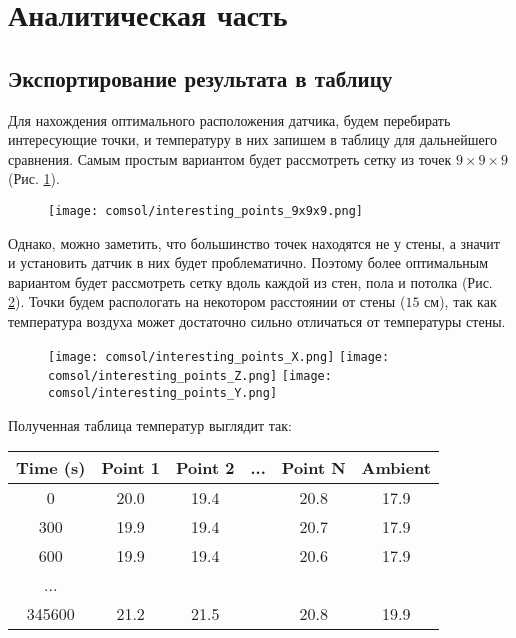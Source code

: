 \graphicspath{{./images/algo}}
\section{Аналитическая часть}

\subsection{Экспортирование результата в таблицу}

Для нахождения оптимального расположения датчика, будем перебирать интересующие точки, и температуру в них запишем в таблицу для дальнейшего сравнения. Самым простым вариантом будет рассмотреть сетку из точек $9 \times 9 \times 9$ (Рис. \ref{9x9x9}).

\begin{figure}[H]
\texttt{[image: comsol/interesting\_points\_9x9x9.png]}
\caption{}
\label{9x9x9}
\end{figure}

Однако, можно заметить, что большинство точек находятся не у стены, а значит и установить датчик в них будет проблематично. Поэтому более оптимальным вариантом будет рассмотреть сетку вдоль каждой из стен, пола и потолка (Рис. \ref{interesting_points}). Точки будем распологать на некотором расстоянии от стены ($15$ см), так как температура воздуха может достаточно сильно отличаться от температуры стены.

\begin{figure}[H]
\texttt{[image: comsol/interesting\_points\_X.png]}
\texttt{[image: comsol/interesting\_points\_Z.png]}
\texttt{[image: comsol/interesting\_points\_Y.png]}
\caption{}
\label{interesting_points}
\end{figure}

Полученная таблица температур выглядит так:

\begin{table}[H]
\centering
\begin{tabular}{c|c|c|c|c|c}
\textbf{Time (s)} & \textbf{Point 1} & \textbf{Point 2} & ... & \textbf{Point N} & \textbf{Ambient} \\ \hline
0                 & 20.0             & 19.4             &     & 20.8              & 17.9             \\
300               & 19.9             & 19.4             &     & 20.7              & 17.9             \\
600               & 19.9             & 19.4             &     & 20.6              & 17.9             \\
...               &                  &                  &     &                   &                  \\
345600            & 21.2             & 21.5             &     & 20.8              & 19.9            
\end{tabular}
\end{table}

